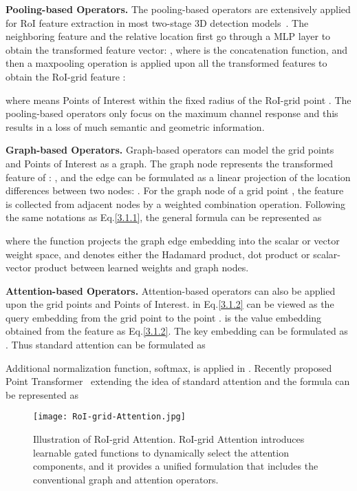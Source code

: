 \documentclass[10pt,twocolumn,letterpaper]{article}
\begin{document}
\textbf{Pooling-based Operators.} The pooling-based operators are extensively applied for RoI feature extraction in most two-stage 3D detection models~\cite{shi2020pv, deng2020voxel, shi2021pv}. The neighboring feature  and the relative location  first go through a MLP layer to obtain the transformed feature vector: , where  is the concatenation function, and then a maxpooling operation is applied upon all the transformed features  to obtain the RoI-grid feature :
 
where  means Points of Interest within the fixed radius  of the RoI-grid point . The pooling-based operators only focus on the maximum channel response and this results in a loss of much semantic and geometric information.

\textbf{Graph-based Operators.} Graph-based operators can model the grid points and Points of Interest as a graph. The graph node  represents the transformed feature of : , and the edge  can be formulated as a linear projection of the location differences between two nodes: . For the graph node of a grid point , the feature  is collected from adjacent nodes by a weighted combination operation. Following the same notations as Eq.\ref{3.1.1}, the general formula can be represented as

where the function  projects the graph edge embedding into the scalar or vector weight space, and  denotes either the Hadamard product, dot product or scalar-vector product between learned weights and graph nodes.

\textbf{Attention-based Operators.} Attention-based operators can also be applied upon the grid points and Points of Interest.  in Eq.\ref{3.1.2} can be viewed as the query embedding from the grid point  to the point .  is the value embedding obtained from the feature  as Eq.\ref{3.1.2}. The key embedding  can be formulated as . Thus standard attention can be formulated as

Additional normalization function, \ie softmax, is applied in . Recently proposed Point Transformer~\cite{zhao2020point} extending the idea of standard attention and the formula can be represented as


\begin{figure}[!t]
\centering
\texttt{[image: RoI-grid-Attention.jpg]}
\caption{Illustration of RoI-grid Attention. RoI-grid Attention introduces learnable gated functions  to dynamically select the attention components, and it provides a unified formulation that includes the conventional graph and attention operators.}
\label{fig_attention}
\vspace{-4mm}
\end{figure}
\end{document}
